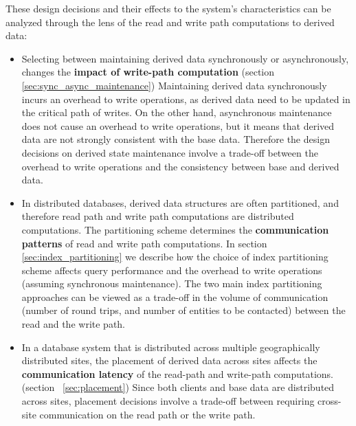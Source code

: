These design decisions and their effects to the system's characteristics can be analyzed through the lens of the
read and write path computations to derived data:
\begin{itemize}

  \item Selecting between maintaining derived data synchronously or asynchronously, changes the
  \textbf{impact of write-path computation} (section~ \ref{sec:sync_async_maintenance})
  Maintaining derived data synchronously incurs an overhead to write operations, as derived data need to be updated in
  the critical path of writes.
  On the other hand, asynchronous maintenance does not cause an overhead to write operations, but it means that derived
  data are not strongly consistent with the base data.
  Therefore the design decisions on derived state maintenance involve a trade-off between the overhead to write operations
  and the consistency between base and derived data.

  \item In distributed databases, derived data structures are often partitioned,
  and therefore read path and write path computations are distributed computations.
  The partitioning scheme determines the \textbf{communication patterns} of read and write path computations.
  In section~ \ref{sec:index_partitioning} we describe how the choice of index partitioning scheme affects query
  performance and the overhead to write operations (assuming synchronous maintenance).
  The two main index partitioning approaches can be viewed as a trade-off in the volume of communication (number
  of round trips, and number of entities to be contacted) between the read and the write path.

  \item In a database system that is distributed across multiple geographically distributed sites, the placement of
  derived data across sites affects the \textbf{communication latency} of the read-path and write-path computations.
  (section~ \ref{sec:placement})
  Since both clients and base data are distributed across sites, placement decisions involve a trade-off between
  requiring cross-site communication on the read path or the write path.

\end{itemize}

